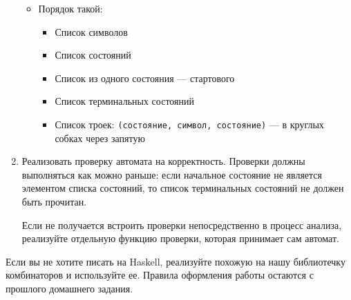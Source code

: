 \documentclass{article}
\begin{document}
\begin{enumerate}
{\begin{itemize}
        \item Порядок такой: 
        
        \begin{itemize}
            \item Список символов 
            \item Список состояний
            \item Список из одного состояния --- стартового
            \item Список терминальных состояний
            \item Список троек: \verb!(состояние, символ, состояние)! --- в круглых собках через запятую
        \end{itemize}
    \end{itemize}
    
  }
  \item
  {
    Реализовать проверку автомата на корректность. Проверки должны выполняться как можно раньше: если начальное состояние не является элементом списка состояний, то список терминальных состояний не должен быть прочитан. 
    
    Если не получается встроить проверки непосредственно в процесс анализа, реализуйте отдельную функцию проверки, которая принимает сам автомат. 
    
  }
\end{enumerate}


    Если вы не хотите писать на Haskell, реализуйте похожую на нашу библиотечку комбинаторов и используйте ее. Правила оформления работы остаются с прошлого домашнего задания.
\end{document}

